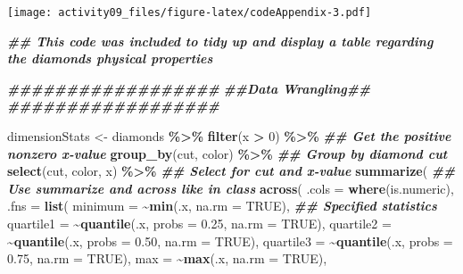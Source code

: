 \documentclass[
]{article}
\newenvironment{Shaded}{\begin{snugshade}}{\end{snugshade}}
\newcommand{\AttributeTok}[1]{\textcolor[rgb]{0.13,0.29,0.53}{#1}}
\newcommand{\ConstantTok}[1]{\textcolor[rgb]{0.56,0.35,0.01}{#1}}
\newcommand{\DecValTok}[1]{\textcolor[rgb]{0.00,0.00,0.81}{#1}}
\newcommand{\DocumentationTok}[1]{\textcolor[rgb]{0.56,0.35,0.01}{\textbf{\textit{#1}}}}
\newcommand{\FloatTok}[1]{\textcolor[rgb]{0.00,0.00,0.81}{#1}}
\newcommand{\FunctionTok}[1]{\textcolor[rgb]{0.13,0.29,0.53}{\textbf{#1}}}
\newcommand{\NormalTok}[1]{#1}
\newcommand{\OtherTok}[1]{\textcolor[rgb]{0.56,0.35,0.01}{#1}}
\newcommand{\SpecialCharTok}[1]{\textcolor[rgb]{0.81,0.36,0.00}{\textbf{#1}}}
\begin{document}
\texttt{[image: activity09\_files/figure-latex/codeAppendix-3.pdf]}

\begin{Shaded}
\begin{Highlighting}[]
\DocumentationTok{\#\# This code was included to tidy up and display a table regarding the diamonds\textquotesingle{} physical properties}

\DocumentationTok{\#\#\#\#\#\#\#\#\#\#\#\#\#\#\#\#\#\#}
\DocumentationTok{\#\#Data Wrangling\#\#}
\DocumentationTok{\#\#\#\#\#\#\#\#\#\#\#\#\#\#\#\#\#\#}

\NormalTok{dimensionStats }\OtherTok{\textless{}{-}}\NormalTok{ diamonds }\SpecialCharTok{\%\textgreater{}\%}                                      
  \FunctionTok{filter}\NormalTok{(x }\SpecialCharTok{\textgreater{}} \DecValTok{0}\NormalTok{) }\SpecialCharTok{\%\textgreater{}\%}                                              \DocumentationTok{\#\# Get the positive nonzero x{-}value}
  \FunctionTok{group\_by}\NormalTok{(cut, color) }\SpecialCharTok{\%\textgreater{}\%}                                              \DocumentationTok{\#\# Group by diamond cut}
  \FunctionTok{select}\NormalTok{(cut, color, x) }\SpecialCharTok{\%\textgreater{}\%}                                             \DocumentationTok{\#\# Select for cut and x{-}value}
  \FunctionTok{summarize}\NormalTok{(                                                     }\DocumentationTok{\#\# Use summarize and across like in class}
    \FunctionTok{across}\NormalTok{(}
      \AttributeTok{.cols =} \FunctionTok{where}\NormalTok{(is.numeric),}
      \AttributeTok{.fns =} \FunctionTok{list}\NormalTok{(}
        \AttributeTok{minimum =} \SpecialCharTok{\textasciitilde{}}\FunctionTok{min}\NormalTok{(.x, }\AttributeTok{na.rm =} \ConstantTok{TRUE}\NormalTok{),                        }\DocumentationTok{\#\# Specified statistics}
        \AttributeTok{quartile1 =} \SpecialCharTok{\textasciitilde{}}\FunctionTok{quantile}\NormalTok{(.x, }\AttributeTok{probs =} \FloatTok{0.25}\NormalTok{, }\AttributeTok{na.rm =} \ConstantTok{TRUE}\NormalTok{),}
        \AttributeTok{quartile2 =} \SpecialCharTok{\textasciitilde{}}\FunctionTok{quantile}\NormalTok{(.x, }\AttributeTok{probs =} \FloatTok{0.50}\NormalTok{, }\AttributeTok{na.rm =} \ConstantTok{TRUE}\NormalTok{),}
        \AttributeTok{quartile3 =} \SpecialCharTok{\textasciitilde{}}\FunctionTok{quantile}\NormalTok{(.x, }\AttributeTok{probs =} \FloatTok{0.75}\NormalTok{, }\AttributeTok{na.rm =} \ConstantTok{TRUE}\NormalTok{),}
        \AttributeTok{max =} \SpecialCharTok{\textasciitilde{}}\FunctionTok{max}\NormalTok{(.x, }\AttributeTok{na.rm =} \ConstantTok{TRUE}\NormalTok{),}

\end{Highlighting}
\end{Shaded}
\end{document}
